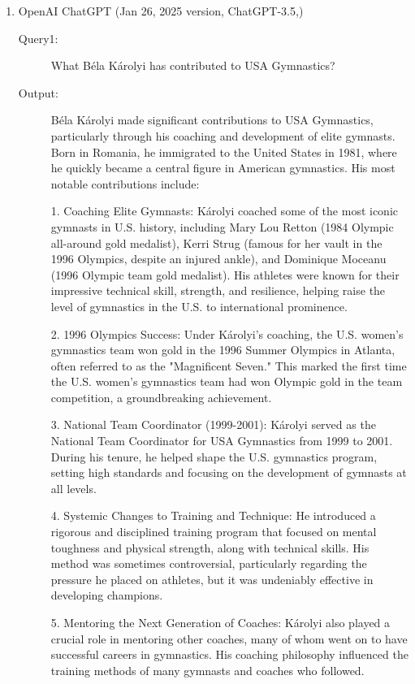 \documentclass{mcmthesis}
\begin{document}
	\begin{enumerate}
		\item OpenAI ChatGPT (Jan 26, 2025 version, ChatGPT-3.5,) 
		\begin{description}
			\item[Query1:] What Béla Károlyi has contributed to USA Gymnastics?
			\item[Output:] Béla Károlyi made significant contributions to USA Gymnastics, particularly through his coaching and development of elite gymnasts. Born in Romania, he immigrated to the United States in 1981, where he quickly became a central figure in American gymnastics. His most notable contributions include:
			
			1. Coaching Elite Gymnasts:
			Károlyi coached some of the most iconic gymnasts in U.S. history, including Mary Lou Retton (1984 Olympic all-around gold medalist), Kerri Strug (famous for her vault in the 1996 Olympics, despite an injured ankle), and Dominique Moceanu (1996 Olympic team gold medalist). His athletes were known for their impressive technical skill, strength, and resilience, helping raise the level of gymnastics in the U.S. to international prominence.
			
			2. 1996 Olympics Success:
			Under Károlyi's coaching, the U.S. women’s gymnastics team won gold in the 1996 Summer Olympics in Atlanta, often referred to as the "Magnificent Seven." This marked the first time the U.S. women's gymnastics team had won Olympic gold in the team competition, a groundbreaking achievement.
			
			3. National Team Coordinator (1999-2001):
			Károlyi served as the National Team Coordinator for USA Gymnastics from 1999 to 2001. During his tenure, he helped shape the U.S. gymnastics program, setting high standards and focusing on the development of gymnasts at all levels.
			
			4. Systemic Changes to Training and Technique:
			He introduced a rigorous and disciplined training program that focused on mental toughness and physical strength, along with technical skills. His method was sometimes controversial, particularly regarding the pressure he placed on athletes, but it was undeniably effective in developing champions.
			
			5. Mentoring the Next Generation of Coaches:
			Károlyi also played a crucial role in mentoring other coaches, many of whom went on to have successful careers in gymnastics. His coaching philosophy influenced the training methods of many gymnasts and coaches who followed.
			

\end{description}
\end{enumerate}
\end{document}
